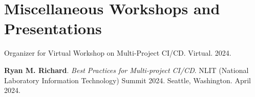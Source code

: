 \section{Miscellaneous Workshops and Presentations}
\begin{etaremune}
	\item{Organizer for Virtual Workshop on Multi-Project CI/CD. Virtual. 2024.}
	\item{\textbf{Ryan M. Richard}. \emph{Best Practices for Multi-project
	      CI/CD}. NLIT (National Laboratory Information Technology) Summit 2024.
		  Seattle, Washington. April 2024.}
\end{etaremune}

